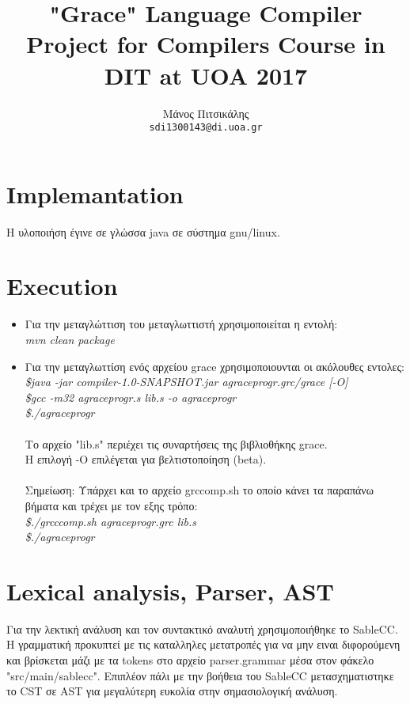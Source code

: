 \documentclass[12pt]{article}
\title{"Grace" Language Compiler Project for Compilers Course in DIT at UOA 2017}
\author{Μάνος Πιτσικάλης\\
  \texttt{sdi1300143@di.uoa.gr}}
\date{}
\begin{document}
\maketitle
\section*{Implemantation}
Η υλοποιήση έγινε σε γλώσσα java σε σύστημα gnu/linux.

\section*{Execution}
\begin{itemize}

\item Για την μεταγλώττιση του μεταγλωττιστή χρησιμοποιείται η εντολή:\\
 \emph{mvn clean package}
\item Για την μεταγλωττίση ενός αρχείου grace χρησιμοποιουνται οι ακόλουθες εντολες:\\
\emph{\$java -jar compiler-1.0-SNAPSHOT.jar agraceprogr.grc/grace [-O]\\
\$gcc -m32 agraceprogr.s lib.s -o agraceprogr\\
\$./agraceprogr }\\\\
Το αρχείο "lib.s" περιέχει τις συναρτήσεις της βιβλιοθήκης grace.\\

Η επιλογή -O επιλέγεται για βελτιστοποίηση (beta).\\\\
Σημείωση: Υπάρχει και το αρχείο grccomp.sh το οποίο κάνει τα παραπάνω βήματα και τρέχει με τον εξης τρόπο:\\
\emph{\$./grcccomp.sh agraceprogr.grc lib.s\\
\$./agraceprogr}


\end{itemize}
\section*{Lexical analysis, Parser, AST}
Για την λεκτική ανάλυση και τον συντακτικό αναλυτή χρησιμοποιήθηκε το SableCC. Η γραμματική προκυπτεί με τις καταλληλες μετατροπές για να μην ειναι διφορούμενη και βρίσκεται μάζι με τα tokens στο αρχείο parser.grammar μέσα στον φάκελο "src/main/sablecc". Επιπλέον πάλι με την βοήθεια του SableCC μετασχηματιστηκε το CST σε AST για μεγαλύτερη ευκολία στην σημασιολογική ανάλυση.
\end{document}
